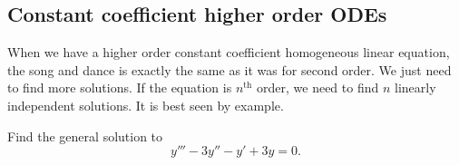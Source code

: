 \subsection{Constant coefficient higher order ODEs}

When we have a higher order constant coefficient homogeneous linear
equation, the song and dance is exactly the same as it was for second order.
We just need to find more solutions.  If the equation is
$n^{\text{th}}$ order, we need to find $n$ linearly independent solutions.
It is best seen by example.

\begin{example}
Find the general solution to
\begin{equation} \label{hol:cceq1}
y''' - 3 y'' - y' + 3y = 0 .
\end{equation}
\end{example}

